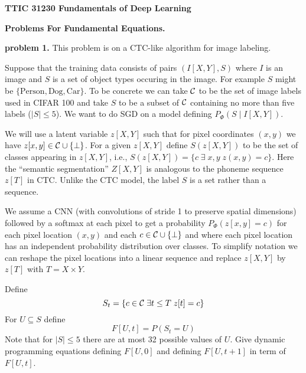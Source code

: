 \documentclass{article}
\begin{document}
\centerline{\bf TTIC 31230 Fundamentals of Deep Learning}

\bigskip

\centerline{\bf Problems For Fundamental Equations.}

\bigskip
\bigskip
{\bf problem 1.} This problem is on a CTC-like algorithm for image labeling.

Suppose that the training data consists of pairs $(I[X,Y],S)$ where $I$ is an image and $S$
is a set of object types occuring in the image.  For example $S$ might be $\{\mathrm{Person},\mathrm{Dog},\mathrm{Car}\}$.
To be concrete we can take ${\cal C}$ to be the set of image labels used in CIFAR 100 and take $S$ to be a subset
of ${\cal C}$ containing no more than five labels ($|S| \leq 5$).
We want to do SGD on a model defining $P_\Phi(S\;|\;I[X,Y])$.

We will use a latent variable $z[X,Y]$ such that for pixel coordinates $(x,y)$ we have $z[x,y] \in {\cal C} \cup \{\bot\}$.
For a given $z[X,Y]$ define $S(z[X,Y])$ to be the set of classes appearing in $z[X,Y]$, i.e.,
$S(z[X,Y]) = \{c\;\exists\;x,y\;z(x,y) = c\}$. Here the ``semantic segmentation'' $Z[X,Y]$ is analogous to the phoneme
sequence $z[T]$ in CTC. Unlike the CTC model, the label
$S$ is a set rather than a sequence.

We assume a CNN (with convolutions of stride 1 to preserve spatial dimensions) followed by
a softmax at each pixel to get a probability
$P_\Phi(z[x,y] = c)$ for each pixel location $(x,y)$ and each $c \in {\cal C} \cup \{\bot\}$ and where
each pixel location has an independent probability distribution over classes. 
To simplify notation we can reshape the pixel locations into a linear sequence
and replace $z[X,Y]$ by $z[T]$ with $T = X \times Y$.

Define
$$S_t = \{c \in {\cal C}\;\exists t\leq T\;z[t] = c\}$$
For $U \subseteq S$ define
$$F[U,t] = P(S_t = U)$$
Note that for $|S| \leq 5$ there are at most 32 possible values of $U$.
Give dynamic programming equations defining $F[U,0]$ and defining $F[U,t+1]$ in term of $F[U,t]$.
\end{document}

